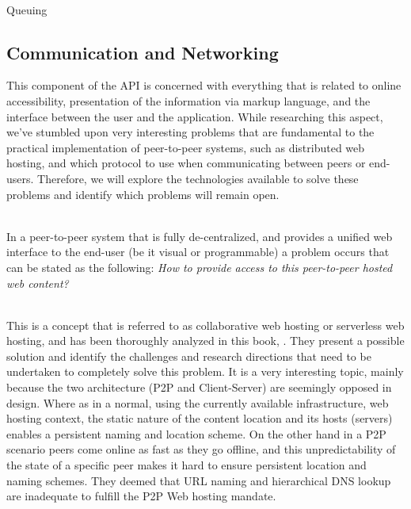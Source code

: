 \documentclass[11pt]{amsart}
\begin{document}
\begin{enumarate}
          \\ Queuing 
          
          \subsection{Communication and Networking}
          This component of the API is concerned with everything that is related to online
          accessibility, presentation of the information via markup language, and the
          interface between the user and the application. While researching this aspect,
          we've stumbled upon very interesting problems that are fundamental to the
          practical implementation of peer-to-peer systems, such as distributed web
          hosting, and which protocol to use when communicating between peers or
          end-users. Therefore, we will explore the technologies available to solve these
          problems and identify which problems will remain open.  
          
          \\ In a peer-to-peer system that is fully de-centralized, and provides a unified
          web interface to the end-user (be it visual or programmable) a problem occurs
          that can be stated as the following: \emph{How to provide access to this
            peer-to-peer hosted web content?}
          
          \\ This is a concept that is referred to as collaborative web hosting or
          serverless web hosting, and has been thoroughly analyzed in this book,
          \cite{ahmed2014collaborative}. They present a possible solution and identify the
          challenges and research directions that need to be undertaken to completely
          solve this problem. It is a very interesting topic, mainly because the two
          architecture (P2P and Client-Server) are seemingly opposed in design. Where as
          in a normal, using the currently available infrastructure, web hosting context,
          the static nature of the content location and its hosts (servers) enables a
          persistent naming and location scheme. On the other hand in a P2P scenario peers
          come online as fast as they go offline, and this unpredictability of the
          state of a specific peer makes it hard to ensure persistent location and
          naming schemes. They deemed that URL naming and hierarchical DNS lookup are
          inadequate to fulfill the P2P Web hosting mandate. 
          

\end{enumarate}
\end{document}
